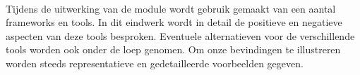 \paragraph{}Tijdens de uitwerking van de module wordt gebruik gemaakt van een aantal frameworks en tools. In dit eindwerk wordt in detail de positieve en negatieve aspecten van deze tools besproken. Eventuele alternatieven voor de verschillende tools worden ook onder de loep genomen. Om onze bevindingen te illustreren worden steeds representatieve en gedetailleerde voorbeelden gegeven.
